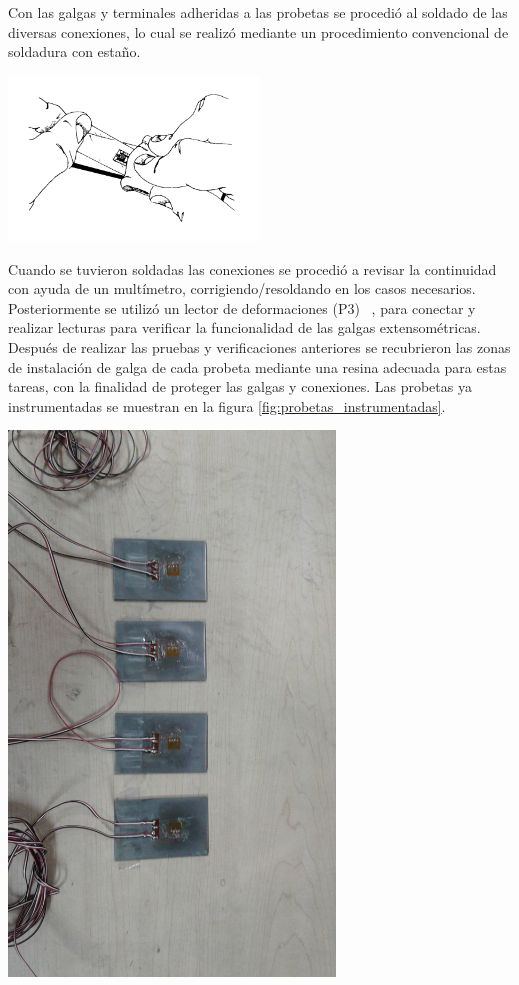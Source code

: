 Con las galgas y terminales adheridas a las probetas se procedió al soldado de las diversas conexiones, lo 
cual se realizó mediante un procedimiento convencional de soldadura con estaño.

\begin{center}
\includegraphics[width=0.5\textwidth]{src/ch3/deslizar_adhesivo.png}
\label{fig:deslizar_adhesivo}
\end{center}

Cuando se tuvieron soldadas las conexiones se procedió a revisar la continuidad con ayuda de un 
multímetro, corrigiendo/resoldando en los casos necesarios. Posteriormente se utilizó un lector 
de deformaciones (P3) ~\cite{p3indicator}, para conectar y realizar lecturas para verificar la funcionalidad de las 
galgas extensométricas.\\

Después de realizar las pruebas y verificaciones anteriores se recubrieron las zonas de instalación 
de galga de cada probeta mediante una resina adecuada para estas tareas, con la finalidad de 
proteger las galgas y conexiones. Las probetas ya instrumentadas se muestran en la 
figura \ref{fig:probetas_instrumentadas}.

\begin{center}
\includegraphics[width=0.65\textwidth]{src/ch3/probetas_instrumentadas.jpg}
\label{fig:probetas_instrumentadas}
\end{center}

